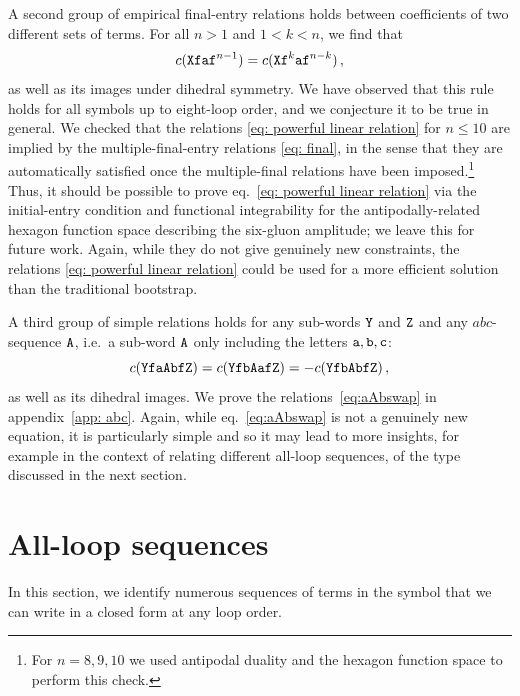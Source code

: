 \documentclass[12pt]{article}
\begin{document}
A second group of empirical final-entry relations holds between coefficients of two different sets of terms.  For all $n>1$ and $1<k<n$, we find that
\begin{equation}
\label{eq: powerful linear relation}
    c({\tt Xfaf}^{n-1})=c({\tt Xf}^k{\tt af}^{n-k})\,,
\end{equation}
as well as its images under dihedral symmetry.
We have observed that this rule holds for all symbols up to eight-loop order, and we conjecture it to be true in general.
We checked that the relations \eqref{eq: powerful linear relation} for $n\leq10$ are implied by the multiple-final-entry relations \eqref{eq: final}, in the sense that they are automatically satisfied once the multiple-final relations have been imposed.\footnote{
For $n=8,9,10$ we used antipodal duality and the hexagon function space to perform this check.}
Thus, it should be possible to prove eq.~\eqref{eq: powerful linear relation} via the initial-entry condition and functional integrability for the antipodally-related hexagon function space describing the six-gluon amplitude; we leave this for future work. Again, while they do not give genuinely new constraints, the relations \eqref{eq: powerful linear relation} could be used for a more efficient solution than the traditional bootstrap.

A third group of simple relations holds for any sub-words $\tt Y$ and $\tt Z$ and any $abc$-sequence $\tt A$, i.e.\ a sub-word $\tt A$ only including the letters $\tt a,b,c$:
%
\begin{equation}
c({\tt YfaAbfZ}) = c({\tt YfbAafZ}) = -c({\tt YfbAbfZ})\,,
\label{eq:aAbswap}
\end{equation}
as well as its dihedral images. We prove the relations~\eqref{eq:aAbswap} in appendix~\ref{app: abc}.
%
Again, while eq.~\eqref{eq:aAbswap} is not a genuinely new equation, it is particularly simple and so it may lead to more insights, for example in the context of relating different all-loop sequences, of the type discussed in the next section.

\section{All-loop sequences}
\label{sec:rays}

In this section, we identify numerous sequences of terms in the symbol that we can write in a closed form at any loop order.
\end{document}
